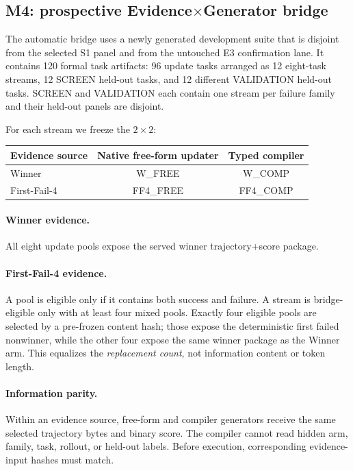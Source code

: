 \subsection{M4: prospective Evidence$\times$Generator bridge}
The automatic bridge uses a newly generated development suite that is disjoint from the selected S1 panel and from the untouched E3 confirmation lane. It contains 120 formal task artifacts: 96 update tasks arranged as 12 eight-task streams, 12 SCREEN held-out tasks, and 12 different VALIDATION held-out tasks. SCREEN and VALIDATION each contain one stream per failure family and their held-out panels are disjoint.

For each stream we freeze the $2\times2$:
\begin{center}
\begin{tabular}{lcc}
\toprule
Evidence source & Native free-form updater & Typed compiler \\
\midrule
Winner & W\_FREE & W\_COMP \\
First-Fail-4 & FF4\_FREE & FF4\_COMP \\
\bottomrule
\end{tabular}
\end{center}

\paragraph{Winner evidence.}
All eight update pools expose the served winner trajectory+score package.

\paragraph{First-Fail-4 evidence.}
A pool is eligible only if it contains both success and failure. A stream is bridge-eligible only with at least four mixed pools. Exactly four eligible pools are selected by a pre-frozen content hash; those expose the deterministic first failed nonwinner, while the other four expose the same winner package as the Winner arm. This equalizes the \emph{replacement count}, not information content or token length.

\paragraph{Information parity.}
Within an evidence source, free-form and compiler generators receive the same selected trajectory bytes and binary score. The compiler cannot read hidden arm, family, task, rollout, or held-out labels. Before execution, corresponding evidence-input hashes must match.

